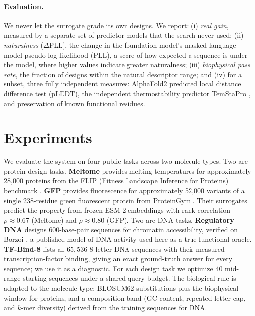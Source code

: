 \documentclass{article}
\begin{document}
\paragraph{Evaluation.}
We never let the surrogate grade its own designs. We report: (i) \emph{real gain}, measured
by a separate set of predictor models that the search never used; (ii)
\emph{naturalness} ($\Delta$PLL), the change in the foundation model's masked language-model
pseudo-log-likelihood (PLL), a score of how expected a sequence is under the model, where
higher values indicate greater naturalness;
(iii) \emph{biophysical pass rate}, the fraction of designs within the natural descriptor
range; and (iv) for a subset, three fully independent measures: AlphaFold2
\citep{jumper2021alphafold, mirdita2022colabfold} predicted local distance difference test
(pLDDT), the independent thermostability predictor TemStaPro
\citep{pudziuvelyte2024temstapro}, and preservation of known functional residues.

\section{Experiments}
\label{sec:experiments}

We evaluate the system on four public tasks across two molecule types. Two are protein
design tasks. \textbf{Meltome} provides melting temperatures for approximately 28{,}000
proteins from the FLIP (Fitness Landscape Inference for Proteins) benchmark
\citep{dallago2021flip, jarzab2020meltome}. \textbf{GFP} provides fluorescence for
approximately 52{,}000 variants of a single 238-residue green fluorescent protein from
ProteinGym \citep{notin2023proteingym, sarkisyan2016gfp}. Their surrogates predict the
property from frozen ESM-2 embeddings with rank correlation $\rho\approx0.67$ (Meltome) and
$\rho\approx0.80$ (GFP). Two are DNA tasks. \textbf{Regulatory DNA} designs 600-base-pair
sequences for chromatin accessibility, verified on Borzoi \citep{linder2025borzoi}, a
published model of DNA activity used here as a true functional oracle. \textbf{TF-Bind-8}
\citep{barrera2016tfbind, trabucco2022designbench} lists all $65{,}536$ 8-letter DNA
sequences with their measured transcription-factor binding, giving an exact ground-truth
answer for every sequence; we use it as a diagnostic. For each design task we optimize 40
mid-range starting sequences under a shared query budget. The biological rule is adapted to
the molecule type: BLOSUM62 substitutions plus the biophysical window for proteins, and a
composition band (GC content, repeated-letter cap, and $k$-mer diversity) derived from the
training sequences for DNA.
\end{document}
